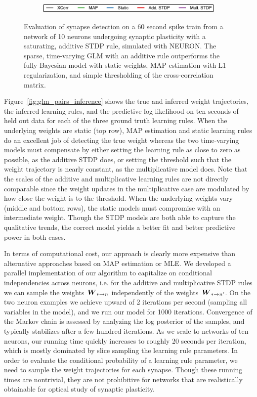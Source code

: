 \begin{figure}[t]
\begin{subfigure}[T]{\textwidth}
  \centering
  \includegraphics[height=1.25em]{figures/ch4/fig5_legend}    
  \end{subfigure}
  \caption{Evaluation of synapse detection on a 60 second spike train from a network of 10 neurons undergoing synaptic plasticity with a saturating, additive STDP rule, simulated with NEURON. The sparse, time-varying GLM with an additive rule outperforms the fully-Bayesian model with static weights,  MAP estimation with L1 regularization, and simple thresholding of the cross-correlation matrix. }
  \label{fig:pynn_roc}
  \vspace{-1em}
\end{figure}

Figure~\ref{fig:glm_pairs_inference} shows the true and inferred weight trajectories, the inferred learning rules, and the predictive log likelihood on ten seconds of held out data for each of the three ground truth learning rules. When the underlying weights are static (top row), MAP estimation and static learning rules do an excellent job of detecting the true weight whereas the two time-varying models must compensate by either setting the learning rule as close to zero as possible, as the additive STDP does, or setting the threshold such that the weight trajectory is nearly constant, as the multiplicative model does. Note that the scales of the additive and multiplicative learning rules are not directly comparable since the weight updates in the multiplicative case are modulated by how close the weight is to the threshold. When the underlying weights vary (middle and bottom rows), the static models must compromise with an intermediate weight. Though the STDP models are both able to capture the qualitative trends, the correct model yields a better fit and better predictive power in both cases.

In terms of computational cost, our approach is clearly more expensive than alternative approaches based on MAP estimation or MLE. We developed a parallel implementation of our algorithm to capitalize on conditional independencies across neurons, i.e. for the additive and multiplicative STDP rules we can sample the weights~${\boldsymbol{W}_{*\to n}}$ independently of the weights~${\boldsymbol{W}_{*\to n'}}$. On the two neuron examples we achieve upward of 2 iterations per second (sampling all variables in the model), and we run our model for 1000 iterations. Convergence of the Markov chain is assessed by analyzing the log posterior of the samples, and typically stabilizes after a few hundred iterations. As we scale to networks of ten neurons, our running time quickly increases to roughly 20 seconds per iteration, which is mostly dominated by slice sampling the learning rule parameters. In order to evaluate the conditional probability of a learning rule parameter, we need to sample the weight trajectories for each synapse. Though these running times are nontrivial, they are not prohibitive for networks that are realistically obtainable for optical study of synaptic plasticity. 

